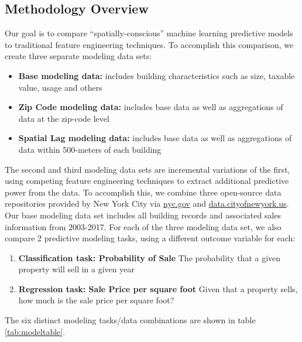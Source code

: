 \documentclass[12pt,]{article}
\providecommand{\tightlist}{%
  \setlength{\itemsep}{0pt}\setlength{\parskip}{0pt}}
\begin{document}
\hypertarget{methodology-overview}{%
\subsection{Methodology Overview}\label{methodology-overview}}

Our goal is to compare ``spatially-conscious'' machine learning
predictive models to traditional feature engineering techniques. To
accomplish this comparison, we create three separate modeling data sets:

\begin{itemize}
\tightlist
\item
  \textbf{Base modeling data:} includes building characteristics such as
  size, taxable value, usage and others
\item
  \textbf{Zip Code modeling data:} includes base data as well as
  aggregations of data at the zip-code level
\item
  \textbf{Spatial Lag modeling data:} includes base data as well as
  aggregations of data within 500-meters of each building
\end{itemize}

\noindent The second and third modeling data sets are incremental
variations of the first, using competing feature engineering techniques
to extract additional predictive power from the data. To accomplish
this, we combine three open-source data repositories provided by New
York City via \url{nyc.gov} and \url{data.cityofnewyork.us}. Our base
modeling data set includes all building records and associated sales
information from 2003-2017. For each of the three modeling data set, we
also compare 2 predictive modeling tasks, using a different outcome
variable for each:

\begin{enumerate}
\def\labelenumi{\arabic{enumi})}
\tightlist
\item
  \textbf{Classification task: Probability of Sale} The probability that
  a given property will sell in a given year
\item
  \textbf{Regression task: Sale Price per square foot} Given that a
  property sells, how much is the sale price per square foot?
\end{enumerate}

\noindent The six distinct modeling tasks/data combinations are shown in
table \ref{tab:modeltable}.
\end{document}
